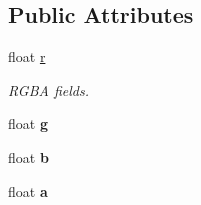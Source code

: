 \subsection*{Public Attributes}
\begin{DoxyCompactItemize}
\item 
\mbox{\label{class_color_a3958a556b47d2de3dd45c75aac833c20}} 
float \mbox{\hyperlink{class_color_a3958a556b47d2de3dd45c75aac833c20}{r}}
\begin{DoxyCompactList}\small\item\em R\+G\+BA fields. \end{DoxyCompactList}\item 
\mbox{\label{class_color_a5defbb21620e480e556181772d665f34}} 
float {\bfseries g}
\item 
\mbox{\label{class_color_a33e482be18d6ea31d2b403bee13683b7}} 
float {\bfseries b}
\item 
\mbox{\label{class_color_a98047aee65fc3d825f88a76da728fd27}} 
float {\bfseries a}
\end{DoxyCompactItemize}
